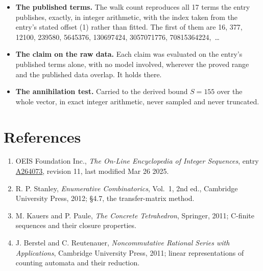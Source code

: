 \documentclass[11pt]{article}
\theoremstyle{definition}
\begin{document}
\begin{itemize}

\item {\bfseries The published terms.} The walk count reproduces all 17 terms the entry publishes, exactly, in integer arithmetic, with the index taken from the entry's stated offset (1) rather than fitted. The first of them are 16, 377, 12100, 239580, 5645376, 130697424, 3057071776, 70815364224,~\dots

\item {\bfseries The claim on the raw data.} Each claim was evaluated on the entry's published terms alone, with no model involved, wherever the proved range and the published data overlap. It holds there.

\item {\bfseries The annihilation test.} Carried to the derived bound $S = 155$ over the whole vector, in exact integer arithmetic, never sampled and never truncated.

\end{itemize}

\section{References}

\begin{enumerate}

\item OEIS Foundation Inc., \emph{The On-Line Encyclopedia of Integer Sequences}, entry \href{https://oeis.org/A264073}{A264073}, revision 11, last modified Mar 26 2025.

\item R. P. Stanley, \emph{Enumerative Combinatorics}, Vol.~1, 2nd ed., Cambridge University Press, 2012; \S4.7, the transfer-matrix method.

\item M. Kauers and P. Paule, \emph{The Concrete Tetrahedron}, Springer, 2011; C-finite sequences and their closure properties.

\item J. Berstel and C. Reutenauer, \emph{Noncommutative Rational Series with Applications}, Cambridge University Press, 2011; linear representations of counting automata and their reduction.

\end{enumerate}
\end{document}
